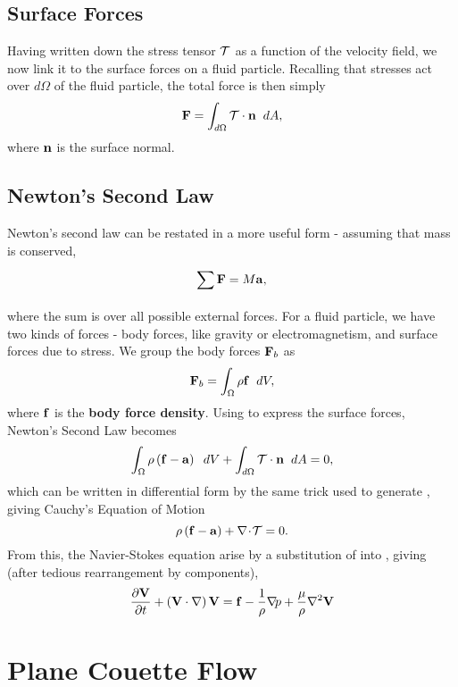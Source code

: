 \subsection{Surface Forces}
Having written down the stress tensor $\mathcal{T}$ as a function of the velocity field, we now link it to the surface forces on a fluid particle. Recalling that stresses act over $d\Omega$ of the fluid particle, the total force is then simply 
\begin{equation}\label{eq:surfaceForce}
\Vector{F} = \int{d\Omega}{}{\Tensor{T}\cdot\Vector{n}}{dA},
\end{equation}
where $\mathbf{n}$ is the surface normal. 
\subsection{Newton's Second Law}
Newton's second law can be restated in a more useful form - assuming that mass is conserved,
\begin{equation}
\sum{}{}{\Vector{F}} = M\Vector{a},
\end{equation}
where the sum is over all possible external forces. For a fluid particle, we have two kinds of forces - body forces, like gravity or electromagnetism, and surface forces due to stress. We group the body forces $\mathbf{F}_b$ as \begin{equation}
\Vector{F}_b = \int{\Omega}{}{\rho\Vector{f}}{dV},
\end{equation}
where $\mathbf{f}$ is the {\bf body force density}. Using  to express the surface forces, Newton's Second Law becomes
\begin{equation}
\int{\Omega}{}{\rho\paren{\Vector{f}-\Vector{a}}}{dV} + \int{d\Omega}{}{\Tensor{T}\cdot\Vector{n}}{dA} = 0,
\end{equation}
which can be written in differential form by the same trick used to generate , giving Cauchy's Equation of Motion
\begin{equation}\label{eq:CauchyEOM}
\rho\left ( \mathbf{f}-\mathbf{a} \right ) + \nabla\!\cdot\!\mathcal{T} = 0.
\end{equation}
From this, the Navier-Stokes equation arise by a substitution of  into , giving (after tedious rearrangement by components),
\begin{equation}
\pder{1}{\Vector{V}}{t} + \paren{\Vector{V}\cdot\nabla}\Vector{V} = \Vector{f} - \frac{1}{\rho}\Grad{p} + \frac{\mu}{\rho}\nabla^2\Vector{V}
\end{equation}

\section{Plane Couette Flow}

